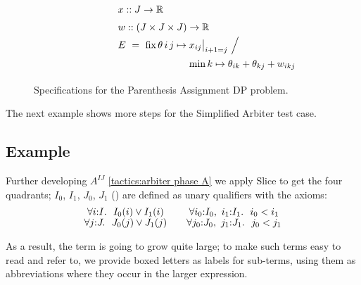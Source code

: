 \begin{figure}
\[
  \renewcommand\arraystretch{1.5}
  \begin{array}{@{}l@{}l@{}l@{}}
    \lspan3{x :: J\to\R} \\
    \lspan3{w :: (J\times J\times J)\to\R} \\
    E ~=~ \fix \theta\,i\,j\mapsto{}
      & \lspan2{x_{ij}\big|_{i+1=j} ~\Big/~} \\
      & \min k\mapsto\theta_{ik}+\theta_{kj}+w_{ikj} \\
  \end{array}
\]
\caption{\label{evaluation:paren spec}
  Specifications for the Parenthesis Assignment DP problem.}
\end{figure}


The next example shows more steps for the Simplified Arbiter test case.


\subsection{Example \hrulefill}

Further developing $A^{IJ}$ \eqref{tactics:arbiter phase A}
we apply Slice to get the four quadrants; $I_0$, $I_1$, $J_0$, $J_1$
() are defined as unary qualifiers with the axioms:
\[
\begin{array}{c@{\qquad}c}
  \forall i{:}I.~~I_0(i)\lor I_1(i)   &    \forall i_0{:}I_0,~i_1{:}I_1.~~i_0<i_1 \\
  \forall j{:}J.~~J_0(j)\lor J_1(j)   &    \forall j_0{:}J_0,~j_1{:}J_1.~~j_0<j_1 \\
\end{array}
\]

As a result, the term is
going to grow quite large; to make such terms easy to read and refer to, we provide
boxed letters as labels for sub-terms, using them as abbreviations where they
occur in the larger expression.

\makeatletter
\newcommand{\quadrants@normal}[4]{
  \renewcommand\arraystretch{1.5}
   \begin{array}{c|c}
     #1 & #2 \\ \hline
     #3 & #4
   \end{array}}
\newcommand{\quadrants@small}[4]{
  \renewcommand\arraystretch{0.9}
   \begin{array}{@{~}c@{~}|@{~}c@{~}}
     \scriptstyle #1 & \scriptstyle #2 \\ \hline
     \scriptstyle #3 & \scriptstyle #4
   \end{array}}
\newcommand\quadrants{\@ifstar\quadrants@small\quadrants@normal}
\makeatother

